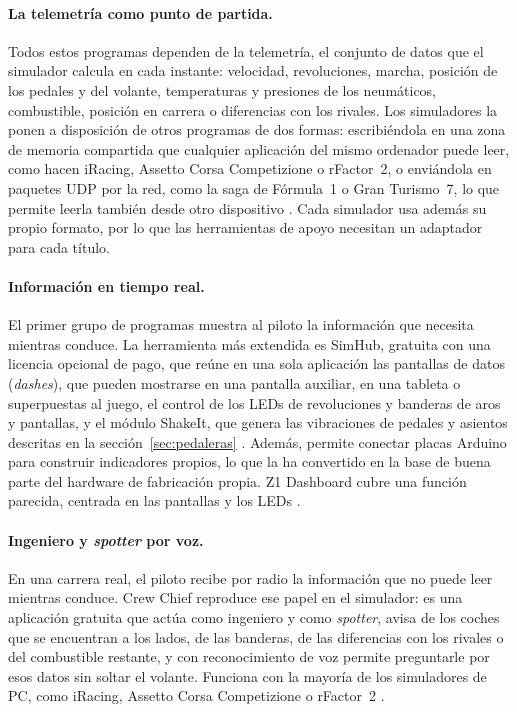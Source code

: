 \paragraph{La telemetría como punto de partida.}
Todos estos programas dependen de la telemetría, el conjunto de datos que el simulador calcula en cada instante: velocidad, revoluciones, marcha, posición de los pedales y del volante, temperaturas y presiones de los neumáticos, combustible, posición en carrera o diferencias con los rivales. Los simuladores la ponen a disposición de otros programas de dos formas: escribiéndola en una zona de memoria compartida que cualquier aplicación del mismo ordenador puede leer, como hacen iRacing, Assetto Corsa Competizione o rFactor~2, o enviándola en paquetes UDP por la red, como la saga de Fórmula~1 o Gran Turismo~7, lo que permite leerla también desde otro dispositivo \parencite{kunos_acc_shared_memory, ea_f1_25_udp, gtplanet_gt7_telemetry}. Cada simulador usa además su propio formato, por lo que las herramientas de apoyo necesitan un adaptador para cada título.

\paragraph{Información en tiempo real.}
El primer grupo de programas muestra al piloto la información que necesita mientras conduce. La herramienta más extendida es SimHub, gratuita con una licencia opcional de pago, que reúne en una sola aplicación las pantallas de datos (\textit{dashes}), que pueden mostrarse en una pantalla auxiliar, en una tableta o superpuestas al juego, el control de los LEDs de revoluciones y banderas de aros y pantallas, y el módulo ShakeIt, que genera las vibraciones de pedales y asientos descritas en la sección~\ref{sec:pedaleras} \parencite{simhub_web}. Además, permite conectar placas Arduino para construir indicadores propios, lo que la ha convertido en la base de buena parte del hardware de fabricación propia. Z1 Dashboard cubre una función parecida, centrada en las pantallas y los LEDs \parencite{z1_web}.

\paragraph{Ingeniero y \textit{spotter} por voz.}
En una carrera real, el piloto recibe por radio la información que no puede leer mientras conduce. Crew Chief reproduce ese papel en el simulador: es una aplicación gratuita que actúa como ingeniero y como \textit{spotter}, avisa de los coches que se encuentran a los lados, de las banderas, de las diferencias con los rivales o del combustible restante, y con reconocimiento de voz permite preguntarle por esos datos sin soltar el volante. Funciona con la mayoría de los simuladores de PC, como iRacing, Assetto Corsa Competizione o rFactor~2 \parencite{crewchief_web}.

